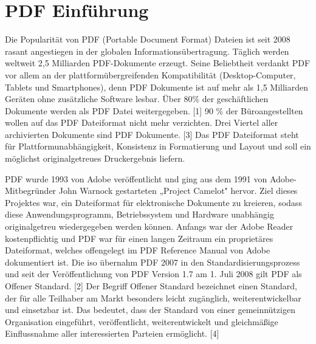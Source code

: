 \section{PDF Einführung}
Die Popularität von PDF (Portable Document Format) Dateien ist seit 2008 rasant angestiegen in der globalen Informationsübertragung. Täglich werden weltweit 2,5 Milliarden PDF-Dokumente erzeugt. Seine Beliebtheit verdankt PDF vor allem an der plattformübergreifenden Kompatibilität (Desktop-Computer, Tablets und Smartphones), denn PDF Dokumente ist auf mehr als 1,5 Milliarden Geräten ohne zusätzliche Software lesbar. Über 80\% der geschäftlichen Dokumente werden als PDF Datei weitergegeben. [1] 90 \% der Büroangestellten wollen auf das PDF Dateiformat nicht mehr verzichten. Drei Viertel aller archivierten Dokumente sind PDF Dokumente. [3] Das PDF Dateiformat steht für Plattformunabhängigkeit, Konsistenz in Formatierung und Layout und soll ein möglichst originalgetreues Druckergebnis liefern.
\par
PDF wurde 1993 von Adobe veröffentlicht und ging aus dem 1991 von Adobe-Mitbegründer John Warnock gestarteten „Project Camelot" hervor. Ziel dieses Projektes war, ein Dateiformat für elektronische Dokumente zu kreieren, sodass diese Anwendungsprogramm, Betriebssystem und Hardware unabhängig originalgetreu wiedergegeben werden können. Anfangs war der Adobe Reader kostenpflichtig und PDF war für einen langen Zeitraum ein proprietäres Dateiformat, welches offengelegt im PDF Reference Manual von Adobe dokumentiert ist. Die \acrshort{iso} übernahm PDF 2007 in den Standardisierungsprozess und seit der Veröffentlichung von PDF Version 1.7 am 1. Juli 2008 gilt PDF als Offener Standard. [2] Der Begriff Offener Standard bezeichnet einen Standard, der für alle Teilhaber am Markt besonders leicht zugänglich, weiterentwickelbar und einsetzbar ist. Das bedeutet, dass der Standard von einer gemeinnützigen Organisation eingeführt, veröffentlicht, weiterentwickelt und gleichmäßige Einflussnahme aller interessierten Parteien ermöglicht. [4]
